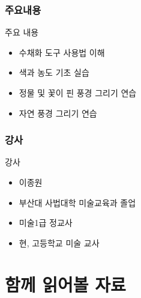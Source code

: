 \documentclass[aspectratio=1610,17pt,xcolor=pdftex,dvipsnames,table,handout]{beamer}
\begin{document}
		\section{주요내용}

		\begin{frame} [t,plain]
			\begin{block} {주요 내용}
			\begin{itemize}
				\item 수채화 도구 사용법 이해
				\item 색과 농도 기초 실습
				\item 정물 및 꽃이 핀 풍경 그리기 연습
				\item 자연 풍경 그리기 연습
			\end{itemize}
			\end{block}
		\end{frame}


		\section{강사}

		\begin{frame} [t,plain]
			\begin{block} {강사}
			\begin{itemize}
				\item 이종원
				\item 부산대 사법대학 미술교육과 졸업
				\item 미술1급 정교사
				\item 현, 고등학교 미술 교사
			\end{itemize}
			\end{block}
		\end{frame}


		\part{ 함께 읽어볼 자료 }
		\frame{\partpage}
		
\end{document}
